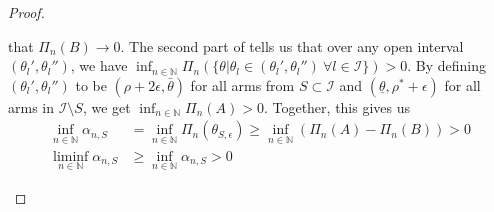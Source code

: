 \begin{proof}
\begin{itemize}
  that $\Pi_n(B) \rightarrow 0$. The second part of  tells
  us that over any open interval $(\theta_l', \theta_l'')$, we have $\inf_{n \in
  \mathbb{N}} \Pi_n(\{\theta| \theta_l \in (\theta_l', \theta_l'')\ \forall l
  \in \mathcal{I}\}) > 0$. By defining $(\theta_l', \theta_l'')$ to be $(\rho +
  2 \epsilon, \bar{\theta})$ for all arms from $S \subset \mathcal{I}$ and
  $(\underline{\theta}, \rho^* + \epsilon)$ for all arms in $\mathcal{I}
  \setminus S$, we get $\inf_{n \in \mathbb{N}} \Pi_n(A) > 0$. Together, this
  gives us
  \begin{align}
    \inf_{n \in \mathbb{N}} \alpha_{n, S} &= \inf_{n \in \mathbb{N}}
        \Pi_n(\theta_{S, \epsilon}) \geq \inf_{n \in \mathbb{N}}(\Pi_n(A) -
        \Pi_n(B)) > 0 \\
    \liminf_{n \in \mathbb{N}} \alpha_{n, S} &\geq \inf_{n \in \mathbb{N}}
        \alpha_{n, S} > 0
  \end{align}
  \end{itemize}
\end{proof}

